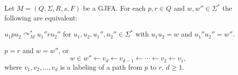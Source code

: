 \documentclass{ws-ijmpc}
\begin{document}
\begin{lemma}
\label{conf vs task}Let $M=\left(Q,\Sigma,R,s,F\right)$ be a GJFA.
For each $p,r\in Q$ and $w,w''\in\Sigma^{*}$ the following are equivalent:
\begin{romanlist}
\item \label{enu:conf}$u_{1}pu_{2}\curvearrowright_{M}^{*}u_{1}''ru_{2}''$
for $u_{1},u_{2},u_{1}'',u_{2}''\in\Sigma^{*}$ with $u_{1}u_{2}=w$
and $u_{1}''u_{2}''=w''$.
\item \label{enu:path}$p=r$ and $w=w''$, or 
\begin{equation}
w\in w''\leftarrow v_{d}\leftarrow v_{d-1}\leftarrow\cdots\leftarrow v_{2}\leftarrow v_{1},\label{eq: comp on path}
\end{equation}
where $v_{1},v_{2},\dots,v_{d}$ is a labeling of a path from $p$
to $r$, $d\ge1$.
\end{romanlist}
\end{lemma}
\end{document}
